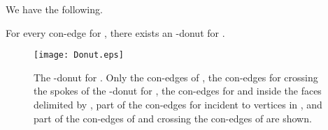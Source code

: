 \documentclass[letter,runningheads]{llncs}
\begin{document}
We have the following.

\begin{lemma} \label{le:donut}
For every con-edge  for , there exists an -donut for .
\end{lemma}

\begin{figure}[tb]
\begin{center}
\mbox{\texttt{[image: Donut.eps]}}
\caption{The -donut for . Only the con-edges of , the con-edges for  crossing the spokes of the -donut for , the con-edges for  and  inside the faces delimited by , part of the con-edges for  incident to vertices in , and part of the con-edges of  and  crossing the con-edges of  are shown.}
\label{fig:donut}
\end{center}
\end{figure}
\end{document}
